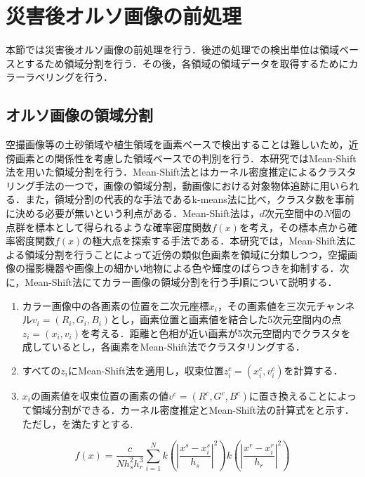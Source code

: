   \section{災害後オルソ画像の前処理}
    本節では災害後オルソ画像の前処理を行う．後述の処理での検出単位は領域ベースとするため領域分割を行う．その後，各領域の領域データを取得するためにカラーラベリングを行う．


    \subsection{オルソ画像の領域分割}
      \label{オルソ画像の領域分割}
      空撮画像等の土砂領域や植生領域を画素ベースで検出することは難しいため，近傍画素との関係性を考慮した領域ベースでの判別を行う．本研究ではMean-Shift法\cite{Mean-Shift法1, Mean-Shift法2}を用いた領域分割を行う．Mean-Shift法とはカーネル密度推定によるクラスタリング手法の一つで，画像の領域分割，動画像における対象物体追跡に用いられる．また，領域分割の代表的な手法であるk-means法\cite{k-means法}に比べ，クラスタ数を事前に決める必要が無いという利点がある．Mean-Shift法は，$d$次元空間中の$N$個の点群を標本として得られるような確率密度関数$f(x)$を考え，その標本点から確率密度関数$f(x)$の極大点を探索する手法である．本研究では，Mean-Shift法による領域分割を行うことによって近傍の類似色画素を領域に分類しつつ，空撮画像の撮影機器や画像上の細かい地物による色や輝度のばらつきを抑制する．次に，Mean-Shift法にてカラー画像の領域分割を行う手順について説明する．

      \begin{enumerate}
        \setlength{\itemsep}{-5pt}
        \item カラー画像中の各画素の位置を二次元座標$x_i$，その画素値を三次元チャンネル$v_{i} =(R_{i},G_{i},B_{i})$とし，画素位置と画素値を結合した5次元空間内の点$z_{i} = (x_{i}, v_{i})$を考える．距離と色相が近い画素が5次元空間内でクラスタを成しているとし，各画素をMean-Shift法でクラスタリングする．
        \item すべての$z_{i}$にMean-Shift法を適用し，収束位置$z_{i}^c = (x_{i}^c , v_{i}^c)$を計算する．
        \item $x_{i}$の画素値を収束位置の画素の値$v^c = (R^c, G^c, B^c)$に置き換えることによって領域分割ができる．カーネル密度推定とMean-Shift法の計算式をと示す．ただし，を満たすとする.
      \end{enumerate}
    
      \begin{equation}
        \label{Mean-Shift法1}
        f(x) = \dfrac{c} {N h_{s}^2 h_{r}^3}
          \sum_{i=1}^{N}
          k (|\dfrac{x^s - x_{i}^s} {h_{s}}|^2) k (|\dfrac{x^r - x_{i}^r} {h_{r}}|^2)
      \end{equation}

